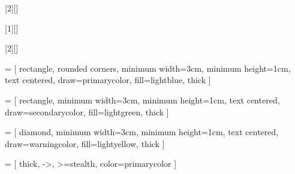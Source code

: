 \newcommand{\api}[1]{\textcolor{codeblue}{\texttt{#1}}}

\newcommand{\dbtablename}[1]{\textcolor{codepurple}{\texttt{#1}}}

\newcommand{\config}[1]{\textcolor{codeorange}{\texttt{#1}}}

\newcommand{\version}[1]{\textcolor{accentcolor}{\texttt{v#1}}}

\newcommand{\shortcut}[1]{\textcolor{darkgray}{\texttt{#1}}}

\newcommand{\weburl}[1]{\textcolor{infocolor}{\texttt{#1}}}


[2][]{
}{}

[1][]{
}{}

[2][]{
}{}


 = [
    rectangle, 
    rounded corners, 
    minimum width=3cm, 
    minimum height=1cm,
    text centered, 
    draw=primarycolor, 
    fill=lightblue,
    thick
]

 = [
    rectangle, 
    minimum width=3cm, 
    minimum height=1cm, 
    text centered, 
    draw=secondarycolor, 
    fill=lightgreen,
    thick
]

 = [
    diamond, 
    minimum width=3cm, 
    minimum height=1cm, 
    text centered, 
    draw=warningcolor, 
    fill=lightyellow,
    thick
]

 = [
    thick,
    ->,
    >=stealth,
    color=primarycolor
]



\newcommand{\tableheader}[1]{
    \rowcolor{primarycolor}
    \textcolor{white}{\textbf{#1}}
}


\newcommand{\sectionseparator}{
    \begin{center}
        \textcolor{primarycolor}{\rule{0.5\textwidth}{0.5pt}}
    \end{center}
}

\newcommand{\subsectionmark}[1]{
    \begin{center}
        \textcolor{secondarycolor}{\faChevronRight\ #1 \ \faChevronLeft}
    \end{center}
}
